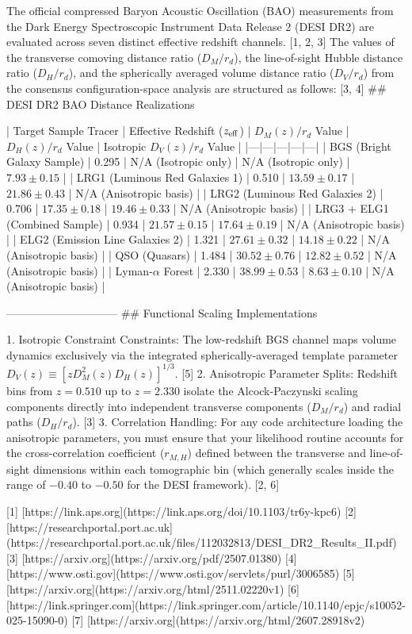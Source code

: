 The official compressed Baryon Acoustic Oscillation (BAO) measurements from the Dark Energy Spectroscopic Instrument Data Release 2 (DESI DR2) are evaluated across seven distinct effective redshift channels. [1, 2, 3] 
The values of the transverse comoving distance ratio ($D_M/r_d$), the line-of-sight Hubble distance ratio ($D_H/r_d$), and the spherically averaged volume distance ratio ($D_V/r_d$) from the consensus configuration-space analysis are structured as follows: [3, 4] 
## DESI DR2 BAO Distance Realizations

| Target Sample Tracer | Effective Redshift ($z_{\rm eff}$) | $D_M(z)/r_d$ Value | $D_H(z)/r_d$ Value | Isotropic $D_V(z)/r_d$ Value |
|---|---|---|---|---|
| BGS (Bright Galaxy Sample) | 0.295 | N/A (Isotropic only) | N/A (Isotropic only) | $7.93 \pm 0.15$ |
| LRG1 (Luminous Red Galaxies 1) | 0.510 | $13.59 \pm 0.17$ | $21.86 \pm 0.43$ | N/A (Anisotropic basis) |
| LRG2 (Luminous Red Galaxies 2) | 0.706 | $17.35 \pm 0.18$ | $19.46 \pm 0.33$ | N/A (Anisotropic basis) |
| LRG3 + ELG1 (Combined Sample) | 0.934 | $21.57 \pm 0.15$ | $17.64 \pm 0.19$ | N/A (Anisotropic basis) |
| ELG2 (Emission Line Galaxies 2) | 1.321 | $27.61 \pm 0.32$ | $14.18 \pm 0.22$ | N/A (Anisotropic basis) |
| QSO (Quasars) | 1.484 | $30.52 \pm 0.76$ | $12.82 \pm 0.52$ | N/A (Anisotropic basis) |
| Lyman-$\alpha$ Forest | 2.330 | $38.99 \pm 0.53$ | $8.63 \pm 0.10$ | N/A (Anisotropic basis) |

------------------------------
## Functional Scaling Implementations

   1. Isotropic Constraint Constraints: The low-redshift BGS channel maps volume dynamics exclusively via the integrated spherically-averaged template parameter $D_V(z)\equiv [z D_M^2(z) D_H(z)]^{1/3}$. [5] 
   2. Anisotropic Parameter Splits: Redshift bins from $z=0.510$ up to $z=2.330$ isolate the Alcock-Paczynski scaling components directly into independent transverse components ($D_M/r_d$) and radial paths ($D_H/r_d$). [3] 
   3. Correlation Handling: For any code architecture loading the anisotropic parameters, you must ensure that your likelihood routine accounts for the cross-correlation coefficient ($r_{M,H}$) defined between the transverse and line-of-sight dimensions within each tomographic bin (which generally scales inside the range of $-0.40$ to $-0.50$ for the DESI framework). [2, 6] 

[1] [https://link.aps.org](https://link.aps.org/doi/10.1103/tr6y-kpc6)
[2] [https://researchportal.port.ac.uk](https://researchportal.port.ac.uk/files/112032813/DESI_DR2_Results_II.pdf)
[3] [https://arxiv.org](https://arxiv.org/pdf/2507.01380)
[4] [https://www.osti.gov](https://www.osti.gov/servlets/purl/3006585)
[5] [https://arxiv.org](https://arxiv.org/html/2511.02220v1)
[6] [https://link.springer.com](https://link.springer.com/article/10.1140/epjc/s10052-025-15090-0)
[7] [https://arxiv.org](https://arxiv.org/html/2607.28918v2)
